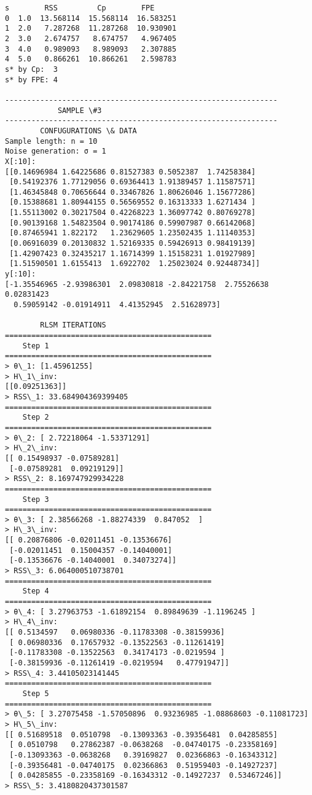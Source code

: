 \documentclass[11pt]{article}
\begin{document}
    \begin{Verbatim}[commandchars=\\\{\}]
     s        RSS         Cp        FPE
0  1.0  13.568114  15.568114  16.583251
1  2.0   7.287268  11.287268  10.930901
2  3.0   2.674757   8.674757   4.967405
3  4.0   0.989093   8.989093   2.307885
4  5.0   0.866261  10.866261   2.598783
s* by Cp:  3
s* by FPE: 4

--------------------------------------------------------------
			SAMPLE \#3
--------------------------------------------------------------
		CONFUGURATIONS \& DATA
Sample length: n = 10
Noise generation: σ = 1
X[:10]:
[[0.14696984 1.64225686 0.81527383 0.5052387  1.74258384]
 [0.54192376 1.77129056 0.69364413 1.91389457 1.11587571]
 [1.46345848 0.70656644 0.33467826 1.80626046 1.15677286]
 [0.15388681 1.80944155 0.56569552 0.16313333 1.6271434 ]
 [1.55113002 0.30217504 0.42268223 1.36097742 0.80769278]
 [0.90139168 1.54823504 0.90174186 0.59907987 0.66142068]
 [0.87465941 1.822172   1.23629605 1.23502435 1.11140353]
 [0.06916039 0.20130832 1.52169335 0.59426913 0.98419139]
 [1.42907423 0.32435217 1.16714399 1.15158231 1.01927989]
 [1.51590501 1.6155413  1.6922702  1.25023024 0.92448734]]
y[:10]:
[-1.35546965 -2.93986301  2.09830818 -2.84221758  2.75526638  0.02831423
  0.59059142 -0.01914911  4.41352945  2.51628973]

		RLSM ITERATIONS
===============================================
	Step 1
===============================================
> θ\_1: [1.45961255]
> H\_1\_inv:
[[0.09251363]]
> RSS\_1: 33.684904369399405
===============================================
	Step 2
===============================================
> θ\_2: [ 2.72218064 -1.53371291]
> H\_2\_inv:
[[ 0.15498937 -0.07589281]
 [-0.07589281  0.09219129]]
> RSS\_2: 8.169747929934228
===============================================
	Step 3
===============================================
> θ\_3: [ 2.38566268 -1.88274339  0.847052  ]
> H\_3\_inv:
[[ 0.20876806 -0.02011451 -0.13536676]
 [-0.02011451  0.15004357 -0.14040001]
 [-0.13536676 -0.14040001  0.34073274]]
> RSS\_3: 6.064000510738701
===============================================
	Step 4
===============================================
> θ\_4: [ 3.27963753 -1.61892154  0.89849639 -1.1196245 ]
> H\_4\_inv:
[[ 0.5134597   0.06980336 -0.11783308 -0.38159936]
 [ 0.06980336  0.17657932 -0.13522563 -0.11261419]
 [-0.11783308 -0.13522563  0.34174173 -0.0219594 ]
 [-0.38159936 -0.11261419 -0.0219594   0.47791947]]
> RSS\_4: 3.44105023141445
===============================================
	Step 5
===============================================
> θ\_5: [ 3.27075458 -1.57050896  0.93236985 -1.08868603 -0.11081723]
> H\_5\_inv:
[[ 0.51689518  0.0510798  -0.13093363 -0.39356481  0.04285855]
 [ 0.0510798   0.27862387 -0.0638268  -0.04740175 -0.23358169]
 [-0.13093363 -0.0638268   0.39169827  0.02366863 -0.16343312]
 [-0.39356481 -0.04740175  0.02366863  0.51959403 -0.14927237]
 [ 0.04285855 -0.23358169 -0.16343312 -0.14927237  0.53467246]]
> RSS\_5: 3.4180820437301587


\end{Verbatim}
\end{document}
